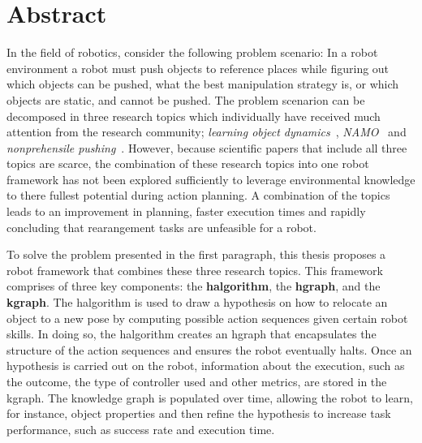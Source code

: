 \chapter*{Abstract}
In the field of robotics, consider the following problem scenario: In a robot environment a robot must push objects to reference places while figuring out which objects can be pushed, what the best manipulation strategy is, or which objects are static, and cannot be pushed. The problem scenarion can be decomposed in three research topics which individually have received much attention from the research community; \textit{learning object dynamics}~\cite{cong_selfadapting_2020,seegmiller_vehicle_2013}, \textit{\acf{NAMO}}~\cite{chen_fast_2018,elbanhawi_samplingbased_2014,kingston_samplingbased_2018,lavalle_planning_2006} and \textit{nonprehensile pushing}~\cite{arruda_uncertainty_2017,bauza_dataefficient_2018,mericli_pushmanipulation_2015,stuber_featurebased_2018,stuber_let_2020,toussaint_sequenceofconstraints_2022}. However, because scientific papers that include all three topics are scarce, the combination of these research topics into one robot framework has not been explored sufficiently to leverage environmental knowledge to there fullest potential during action planning. A combination of the topics leads to an improvement in planning, faster execution times and rapidly concluding that rearangement tasks are unfeasible for a robot.\bs

To solve the problem presented in the first paragraph, this thesis proposes a robot framework that combines these three research topics. This framework comprises of three key components: the \textbf{\acl{halgorithm}}, the \textbf{\acl{hgraph}}, and the \textbf{\acl{kgraph}}. The \acl{halgorithm} is used to draw a hypothesis on how to relocate an object to a new pose by computing possible action sequences given certain robot skills. In doing so, the \acl{halgorithm} creates an \acl{hgraph} that encapsulates the structure of the action sequences and ensures the robot eventually halts. Once an hypothesis is carried out on the robot, information about the execution, such as the outcome, the type of controller used and other metrics, are stored in the \acl{kgraph}. The knowledge graph is populated over time, allowing the robot to learn, for instance, object properties and then refine the hypothesis to increase task performance, such as success rate and execution time.\bs

